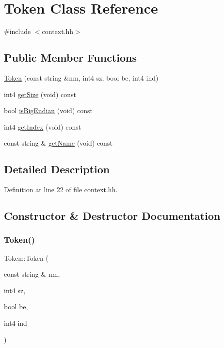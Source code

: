 \hypertarget{class_token}{}\section{Token Class Reference}
\label{class_token}


{\ttfamily \#include $<$context.\+hh$>$}

\subsection*{Public Member Functions}
\begin{DoxyCompactItemize}
\item 
\mbox{\hyperlink{class_token_aee347f51023987d80cb0ae157a5a7830}{Token}} (const string \&nm, int4 sz, bool be, int4 ind)
\item 
int4 \mbox{\hyperlink{class_token_a2151b6987a4821ecfbd527973de5219e}{get\+Size}} (void) const
\item 
bool \mbox{\hyperlink{class_token_ae5f6fe0959a697bb332e3c957f166941}{is\+Big\+Endian}} (void) const
\item 
int4 \mbox{\hyperlink{class_token_aff0c02f3e00144c7225b28649f23dbbd}{get\+Index}} (void) const
\item 
const string \& \mbox{\hyperlink{class_token_a58bc31cd9e0d154d081d160f6fb64569}{get\+Name}} (void) const
\end{DoxyCompactItemize}


\subsection{Detailed Description}


Definition at line 22 of file context.\+hh.



\subsection{Constructor \& Destructor Documentation}
\mbox{\label{class_token_aee347f51023987d80cb0ae157a5a7830}} 
\subsubsection{\texorpdfstring{Token()}{Token()}}
{\footnotesize\ttfamily Token\+::\+Token (\begin{DoxyParamCaption}\item[{const string \&}]{nm,  }\item[{int4}]{sz,  }\item[{bool}]{be,  }\item[{int4}]{ind }\end{DoxyParamCaption})\hspace{0.3cm}{\ttfamily [inline]}}



